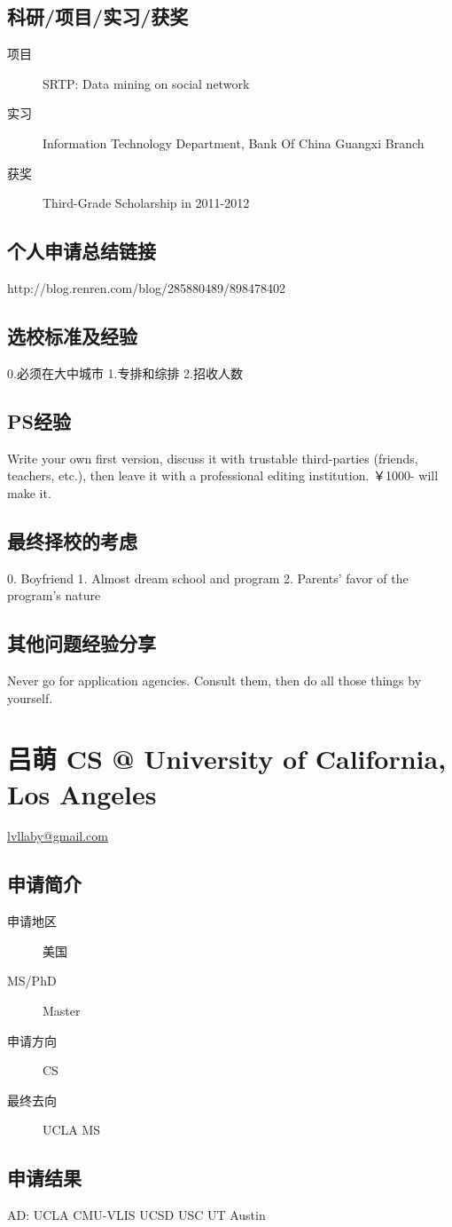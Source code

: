 \documentclass[11pt,fleqn,openany]{book} %
\begin{document}
\subsection*{科研/项目/实习/获奖}
\begin{description}
\item[项目] SRTP: Data mining on social network
\item[实习] Information Technology Department, Bank Of China Guangxi Branch
\item[获奖] Third-Grade Scholarship in 2011-2012
\end{description}
\subsection*{个人申请总结链接}
http://blog.renren.com/blog/285880489/898478402
\subsection*{选校标准及经验}
0.必须在大中城市
1.专排和综排
2.招收人数
\subsection*{PS经验}
Write your own first version, discuss it with trustable third-parties (friends, teachers, etc.), then leave it with a professional editing institution. ￥1000- will make it.
\subsection*{最终择校的考虑}
0. Boyfriend
1. Almost dream school and program
2. Parents' favor of the program's nature
\subsection*{其他问题经验分享}
Never go for application agencies. Consult them, then do all those things by yourself.
\clearpage
\section{吕萌 CS @ University of California, Los Angeles}
\hfill \href{mailto:lvllaby@gmail.com}{lvllaby@gmail.com}

\noindent\begin{minipage}[t]{0.45\textwidth}
\subsection*{申请简介}
\begin{description}
\item[申请地区] 美国
\item[MS/PhD] Master
\item[申请方向] CS
\item[最终去向] UCLA MS
\end{description}
\end{minipage}
\hfill
\begin{minipage}[t]{0.45\textwidth}
\subsection*{申请结果}
\noindent AD: UCLA CMU-VLIS UCSD USC UT Austin
\end{minipage}
\end{document}
